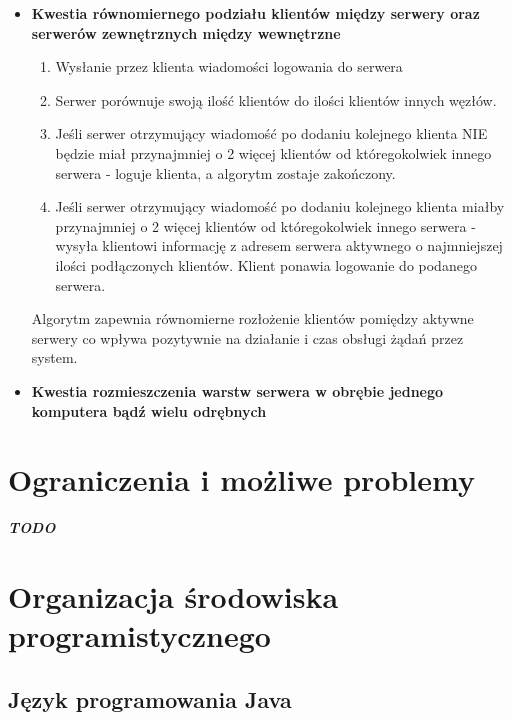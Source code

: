 {\begin{itemize}
\begin{enumerate}
\par{Algorytm ten działa także w przypadku awarii większej liczby serwerów, lecz ma też w związku z tym dłuższy czas realizacji.}

\item W trakcie integracji z serwerem wewnętrznym

\end{enumerate}

\item \textbf{Kwestia równomiernego podziału klientów między serwery oraz serwerów zewnętrznych między wewnętrzne}
\begin{enumerate}
\item Wysłanie przez klienta wiadomości logowania do serwera
\item Serwer porównuje swoją ilość klientów do ilości klientów innych węzłów.
\item Jeśli serwer otrzymujący wiadomość po dodaniu kolejnego klienta NIE będzie miał przynajmniej o 2 więcej klientów od któregokolwiek innego serwera - loguje klienta, a algorytm zostaje zakończony.
\item Jeśli serwer otrzymujący wiadomość po dodaniu kolejnego klienta miałby przynajmniej o 2 więcej klientów od któregokolwiek innego serwera - wysyła klientowi informację z adresem serwera aktywnego o najmniejszej ilości podłączonych klientów. Klient ponawia logowanie do podanego serwera.
\end{enumerate}
\par{Algorytm zapewnia równomierne rozłożenie klientów pomiędzy aktywne serwery co wpływa pozytywnie na działanie i czas obsługi żądań przez system.}

\item \textbf{Kwestia rozmieszczenia warstw serwera w obrębie jednego komputera bądź wielu odrębnych}
\end{itemize}

\section[Ograniczenia i możliwe problemy]{Ograniczenia i możliwe problemy}
\textit{\textbf{TODO}}

\section[Organizacja środowiska programistycznego]{Organizacja środowiska programistycznego}

\subsection[Język programowania Java]{Język programowania Java}

}
